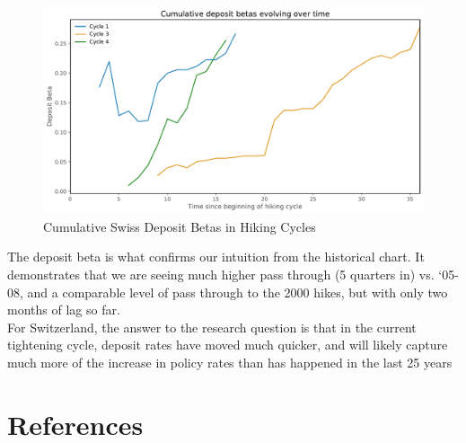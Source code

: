 \documentclass{article}
\begin{document}
\begin{figure}[h]
    \centering
    \includegraphics[width=1\textwidth]{../../figures/deposit_beta_SNB.pdf}
    \caption{Cumulative Swiss Deposit Betas in Hiking Cycles}
    \label{fig:your_pdf}
\end{figure}

The deposit beta is what confirms our intuition from the historical chart. It demonstrates that we are seeing much higher pass through (5 quarters in) vs. ‘05-08, and a comparable level of pass through to the 2000 hikes, but with only two months of lag so far. \\

For Switzerland, the answer to the research question is that in the current tightening cycle, deposit rates have moved much quicker, and will likely capture much more of the increase in policy rates than has happened in the last 25 years


\newpage  %
\section{References}
\printbibliography[heading=none] 
\end{document}
